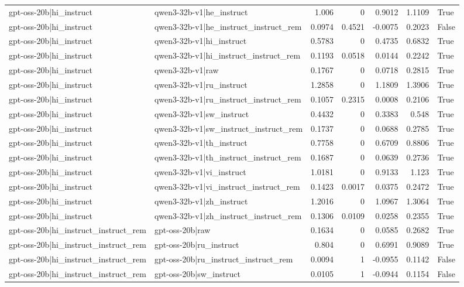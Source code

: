 \begin{table}
\begin{tabular}{l l r r r r l}
gpt-oss-20b|hi_instruct & qwen3-32b-v1|he_instruct & 1.006 & 0 & 0.9012 & 1.1109 & True \\
gpt-oss-20b|hi_instruct & qwen3-32b-v1|he_instruct_instruct_rem & 0.0974 & 0.4521 & -0.0075 & 0.2023 & False \\
gpt-oss-20b|hi_instruct & qwen3-32b-v1|hi_instruct & 0.5783 & 0 & 0.4735 & 0.6832 & True \\
gpt-oss-20b|hi_instruct & qwen3-32b-v1|hi_instruct_instruct_rem & 0.1193 & 0.0518 & 0.0144 & 0.2242 & True \\
gpt-oss-20b|hi_instruct & qwen3-32b-v1|raw & 0.1767 & 0 & 0.0718 & 0.2815 & True \\
gpt-oss-20b|hi_instruct & qwen3-32b-v1|ru_instruct & 1.2858 & 0 & 1.1809 & 1.3906 & True \\
gpt-oss-20b|hi_instruct & qwen3-32b-v1|ru_instruct_instruct_rem & 0.1057 & 0.2315 & 0.0008 & 0.2106 & True \\
gpt-oss-20b|hi_instruct & qwen3-32b-v1|sw_instruct & 0.4432 & 0 & 0.3383 & 0.548 & True \\
gpt-oss-20b|hi_instruct & qwen3-32b-v1|sw_instruct_instruct_rem & 0.1737 & 0 & 0.0688 & 0.2785 & True \\
gpt-oss-20b|hi_instruct & qwen3-32b-v1|th_instruct & 0.7758 & 0 & 0.6709 & 0.8806 & True \\
gpt-oss-20b|hi_instruct & qwen3-32b-v1|th_instruct_instruct_rem & 0.1687 & 0 & 0.0639 & 0.2736 & True \\
gpt-oss-20b|hi_instruct & qwen3-32b-v1|vi_instruct & 1.0181 & 0 & 0.9133 & 1.123 & True \\
gpt-oss-20b|hi_instruct & qwen3-32b-v1|vi_instruct_instruct_rem & 0.1423 & 0.0017 & 0.0375 & 0.2472 & True \\
gpt-oss-20b|hi_instruct & qwen3-32b-v1|zh_instruct & 1.2016 & 0 & 1.0967 & 1.3064 & True \\
gpt-oss-20b|hi_instruct & qwen3-32b-v1|zh_instruct_instruct_rem & 0.1306 & 0.0109 & 0.0258 & 0.2355 & True \\
gpt-oss-20b|hi_instruct_instruct_rem & gpt-oss-20b|raw & 0.1634 & 0 & 0.0585 & 0.2682 & True \\
gpt-oss-20b|hi_instruct_instruct_rem & gpt-oss-20b|ru_instruct & 0.804 & 0 & 0.6991 & 0.9089 & True \\
gpt-oss-20b|hi_instruct_instruct_rem & gpt-oss-20b|ru_instruct_instruct_rem & 0.0094 & 1 & -0.0955 & 0.1142 & False \\
gpt-oss-20b|hi_instruct_instruct_rem & gpt-oss-20b|sw_instruct & 0.0105 & 1 & -0.0944 & 0.1154 & False \\

\end{tabular}
\end{table}
